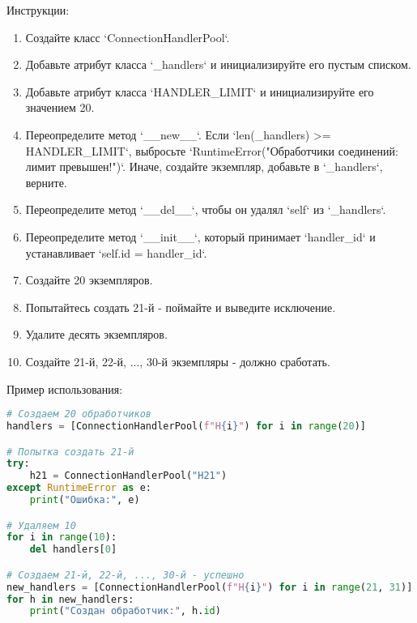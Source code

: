 \begin{enumerate}
Инструкции:
\begin{enumerate}
    \item Создайте класс `ConnectionHandlerPool`.
    \item Добавьте атрибут класса `\_handlers` и инициализируйте его пустым списком.
    \item Добавьте атрибут класса `HANDLER\_LIMIT` и инициализируйте его значением 20.
    \item Переопределите метод `\_\_new\_\_`. Если `len(\_handlers) >= HANDLER\_LIMIT`, выбросьте `RuntimeError("Обработчики соединений: лимит превышен!")`. Иначе, создайте экземпляр, добавьте в `\_handlers`, верните.
    \item Переопределите метод `\_\_del\_\_`, чтобы он удалял `self` из `\_handlers`.
    \item Переопределите метод `\_\_init\_\_`, который принимает `handler\_id` и устанавливает `self.id = handler\_id`.
    \item Создайте 20 экземпляров.
    \item Попытайтесь создать 21-й - поймайте и выведите исключение.
    \item Удалите десять экземпляров.
    \item Создайте 21-й, 22-й, ..., 30-й экземпляры - должно сработать.
\end{enumerate}

Пример использования:
\begin{lstlisting}[language=Python]
# Создаем 20 обработчиков
handlers = [ConnectionHandlerPool(f"H{i}") for i in range(20)]

# Попытка создать 21-й
try:
    h21 = ConnectionHandlerPool("H21")
except RuntimeError as e:
    print("Ошибка:", e)

# Удаляем 10
for i in range(10):
    del handlers[0]

# Создаем 21-й, 22-й, ..., 30-й - успешно
new_handlers = [ConnectionHandlerPool(f"H{i}") for i in range(21, 31)]
for h in new_handlers:
    print("Создан обработчик:", h.id)
\end{lstlisting}

\end{enumerate}